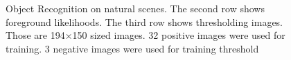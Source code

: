 \documentclass[a4paper,twocolumn, 10pt]{article}
\begin{document}
\begin{figure}[t]
  \hfill
  \hfill
  \caption{Object Recognition on natural scenes. The second row shows foreground likelihoods. The third row shows thresholding images. Those are 194×150 sized images. 32 positive images were used for training. 3 negative images were used for training threshold}
\end{figure}
\end{document}
